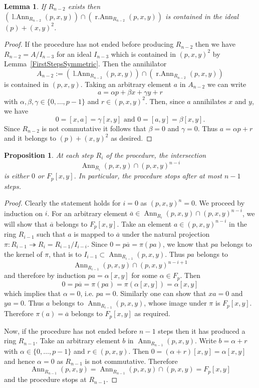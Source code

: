 \documentclass[11pt]{article}
\DeclareMathOperator{\Ann}{Ann}
\DeclareMathOperator{\lAnn}{l.Ann}
\DeclareMathOperator{\rAnn}{r.Ann}
\newtheorem{lemma}[corollary]{Lemma}
\newtheorem{proposition}[corollary]{Proposition}
\theoremstyle{definition}
\begin{document}
\begin{lemma}\label{Stepn-2}
If $R_{n-2}$ exists then $\left(\lAnn_{R_{n-2}}(p,x,y)\right)\cap \left(\rAnn_{R_{n-2}}(p,x,y)\right)$ is contained in the ideal $(p)+(x,y)^2$.
\end{lemma}

\begin{proof}
If the procedure has not ended before producing $R_{n-2}$ then we have $R_{n-2}=A/I_{n-3}$ for an ideal $I_{n-3}$ which is contained in $(p,x,y)^2$ by Lemma~\ref{FirstStepsSymmetric}. Then the annihilator
\[A_{n-2}:=\left(\lAnn_{R_{n-2}}(p,x,y)\right)\cap\left( \rAnn_{R_{n-2}}(p,x,y)\right)\]
is contained in $(p,x,y)$. Taking an arbitrary element $a$ in $A_{n-2}$ we can write
\[a=\alpha p+\beta x+\gamma y+r\]
with $\alpha,\beta,\gamma\in\lbrace0,\ldots,p-1\rbrace$ and $r\in (p,x,y)^2$. Then, since $a$ annihilates $x$ and $y$, we have
\[0=[x,a]=\gamma[x,y] \text{ and }0=[a,y]=\beta[x,y].\]
Since $R_{n-2}$ is not commutative it follows that $\beta=0$ and $\gamma=0$. Thus $a=\alpha p+r$ and it belongs to $(p)+(x,y)^2$ as desired.
\end{proof}

\begin{proposition}\label{AtMostn-1}
At each step $R_i$ of the procedure, the intersection
\[\Ann_{R_i}(p,x,y)\cap (p,x,y)^{n-i}\]
is either $0$ or $F_p[x,y]$. In particular, the procedure stops after at most $n-1$ steps.
\end{proposition}

\begin{proof}
Clearly the statement holds for $i=0$ as $(p,x,y)^{n}=0$. We proceed by induction on $i$. For an arbitrary element $\overline{a}\in\Ann_{R_i}(p,x,y)\cap (p,x,y)^{n-i}$, we will show that $\overline{a}$ belongs to $F_p[x,y]$. Take an element $a\in(p,x,y)^{n-i}$ in the ring $R_{i-1}$ such that $a$ is mapped to $\overline{a}$ under the natural projection $\pi:R_{i-1}\twoheadrightarrow R_i=R_{i-1}/I_{i-i}$. Since $0=p\overline{a}=\pi(pa)$, we know that $pa$ belongs to the kernel of $\pi$, that is to $I_{i-1}\subset \Ann_{R_{i-1}}(p,x,y)$. Thus $pa$ belongs to
\[\Ann_{R_{i-1}}(p,x,y)\cap (p,x,y)^{n-i+1}\]
and therefore by induction $pa=\alpha[x,y]$ for some $\alpha\in F_p$. Then
\[0=p\overline{a}=\pi(pa)=\pi(\alpha[x,y])=\alpha[x,y]\]
which implies that $\alpha=0$, i.e. $pa=0$. Similarly one can show that $xa=0$ and $ya=0$. Thus $a$ belongs to $\Ann_{R_{i-1}}(p,x,y)$, whose image under $\pi$ is $F_p[x,y]$. Therefore $\pi(a)=\overline{a}$ belongs to $F_p[x,y]$ as required.

Now, if the procedure has not ended before $n-1$ steps then it has produced a ring $R_{n-1}$. Take an arbitrary element $b$ in $\Ann_{R_{n-1}}(p,x,y)$. Write $b=\alpha + r$ with $\alpha\in\lbrace0,\ldots,p-1\rbrace$ and  $r\in (p,x,y)$. Then $0=(\alpha+r)[x,y]=\alpha[x,y]$ and hence $\alpha=0$ as $R_{n-1}$ is not commutative. Therefore
\[\Ann_{R_{n-1}}(p,x,y)=\Ann_{R_{n-1}}(p,x,y)\cap(p,x,y) =F_p[x,y]\]
and the procedure stops at $R_{n-1}$.
\end{proof}
\end{document}
